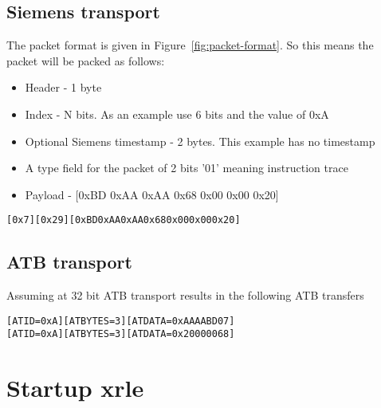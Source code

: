 \subsection{Siemens transport}

The packet format is given in Figure~\ref{fig:packet-format}. So this means the packet will be packed as follows:

\begin{itemize}
\item
  Header - 1 byte
\item
  Index - N bits. As an example use 6 bits and the value of 0xA
\item
  Optional Siemens timestamp - 2 bytes. This example has no timestamp
\item
A type field for the packet of 2 bits '01' meaning instruction trace  
\item
  Payload - [0xBD 0xAA 0xAA 0x68 0x00 0x00 0x20]
\end{itemize}

\begin {alltt}
[0x7][0x29][0xBD 0xAA 0xAA 0x68 0x00 0x00 0x20]
\end{alltt}

\subsection{ATB transport}

Assuming at 32 bit ATB transport results in the following ATB transfers

\begin {alltt}
[ATID=0xA] [ATBYTES = 3] [ATDATA = 0xAAAABD07]
[ATID=0xA] [ATBYTES = 3] [ATDATA = 0x20000068]
\end{alltt}



\section{Startup xrle}

